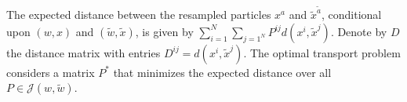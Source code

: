\documentclass[a4paper, 11pt]{article}
\begin{document}
\begin{CJK}{UTF8}{gbsn}
The expected distance between the resampled particles $x^a$ and $\tilde{x}^{\tilde{a}}$, conditional upon $(w,x)$ and $(\tilde{w},\tilde{x})$, is given by $\sum_{i=1}^N \sum_{j=1^N} P^{ij}d(x^i,\tilde{x}^j)$. Denote by $D$ the distance matrix with entries $D^{ij} = d(x^i,\tilde{x}^j)$. The optimal transport problem considers a matrix $P^*$ that minimizes the expected distance over all $P \in \mathcal{J}(w,\tilde{w})$.




\end{CJK}
\end{document}
